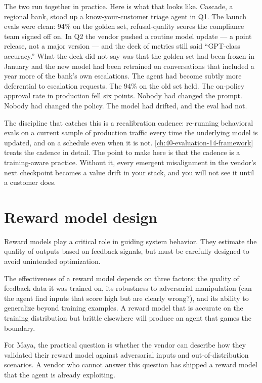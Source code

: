 The two run together in practice. Here is what that looks like. Cascade, a regional bank, stood up a know-your-customer triage agent in Q1. The launch evals were clean: 94\% on the golden set, refusal-quality scores the compliance team signed off on. In Q2 the vendor pushed a routine model update --- a point release, not a major version --- and the deck of metrics still said ``GPT-class accuracy.'' What the deck did not say was that the golden set had been frozen in January and the new model had been retrained on conversations that included a year more of the bank's own escalations. The agent had become subtly more deferential to escalation requests. The 94\% on the old set held. The on-policy approval rate in production fell six points. Nobody had changed the prompt. Nobody had changed the policy. The model had drifted, and the eval had not.

The discipline that catches this is a recalibration cadence: re-running behavioral evals on a current sample of production traffic every time the underlying model is updated, and on a schedule even when it is not. \autoref{ch:40-evaluation-14-framework} treats the cadence in detail. The point to make here is that the cadence is a training-aware practice. Without it, every emergent misalignment in the vendor's next checkpoint becomes a value drift in your stack, and you will not see it until a customer does.

\section{Reward model design}

Reward models play a critical role in guiding system behavior. They estimate the quality of outputs based on feedback signals, but must be carefully designed to avoid unintended optimization.

The effectiveness of a reward model depends on three factors: the quality of feedback data it was trained on, its robustness to adversarial manipulation (can the agent find inputs that score high but are clearly wrong?), and its ability to generalize beyond training examples. A reward model that is accurate on the training distribution but brittle elsewhere will produce an agent that games the boundary.

For Maya, the practical question is whether the vendor can describe how they validated their reward model against adversarial inputs and out-of-distribution scenarios. A vendor who cannot answer this question has shipped a reward model that the agent is already exploiting.

